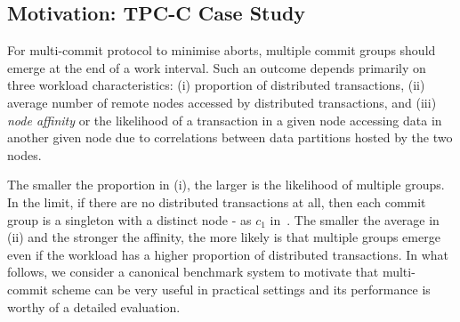 
\subsection{Motivation: TPC-C Case Study}
\label{sec:case-study:-tpc}

For multi-commit protocol to minimise
aborts, multiple commit groups should emerge at the end of a work interval. Such an outcome depends primarily on three workload characteristics: 
(i) proportion of distributed transactions, 
(ii) average number of remote nodes accessed by distributed transactions, and
(iii) \emph{node affinity} or the likelihood of a transaction in a given node accessing data in another given node due to 
correlations between data partitions hosted by the two nodes. 

The smaller the proportion in (i), the larger is the likelihood of multiple groups. In the limit, if there are no distributed transactions at all, then each commit group is a singleton with a distinct node - as $c_1$ in~. The smaller the average in (ii) and the stronger the affinity, the more likely is that multiple groups emerge even if the workload has a higher proportion of  distributed transactions. In what follows, we consider a canonical benchmark system  to motivate that  multi-commit scheme can be very useful in practical settings and its performance is worthy of a detailed evaluation.


